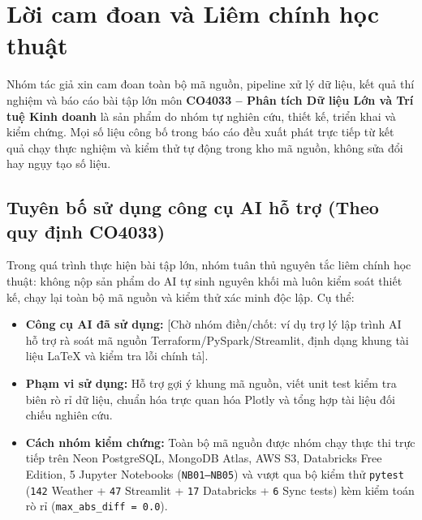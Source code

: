 \chapter*{Lời cam đoan và Liêm chính học thuật}

Nhóm tác giả xin cam đoan toàn bộ mã nguồn, pipeline xử lý dữ liệu, kết quả thí nghiệm và báo cáo bài tập lớn môn \textbf{CO4033 -- Phân tích Dữ liệu Lớn và Trí tuệ Kinh doanh} là sản phẩm do nhóm tự nghiên cứu, thiết kế, triển khai và kiểm chứng. Mọi số liệu công bố trong báo cáo đều xuất phát trực tiếp từ kết quả chạy thực nghiệm và kiểm thử tự động trong kho mã nguồn, không sửa đổi hay ngụy tạo số liệu.

\section*{Tuyên bố sử dụng công cụ AI hỗ trợ (Theo quy định CO4033)}
Trong quá trình thực hiện bài tập lớn, nhóm tuân thủ nguyên tắc liêm chính học thuật: không nộp sản phẩm do AI tự sinh nguyên khối mà luôn kiểm soát thiết kế, chạy lại toàn bộ mã nguồn và kiểm thử xác minh độc lập. Cụ thể:
\begin{itemize}[leftmargin=1.5em]
  \item \textbf{Công cụ AI đã sử dụng:} [Chờ nhóm điền/chốt: ví dụ trợ lý lập trình AI hỗ trợ rà soát mã nguồn Terraform/PySpark/Streamlit, định dạng khung tài liệu \LaTeX{} và kiểm tra lỗi chính tả].
  \item \textbf{Phạm vi sử dụng:} Hỗ trợ gợi ý khung mã nguồn, viết unit test kiểm tra biên rò rỉ dữ liệu, chuẩn hóa trực quan hóa Plotly và tổng hợp tài liệu đối chiếu nghiên cứu.
  \item \textbf{Cách nhóm kiểm chứng:} Toàn bộ mã nguồn được nhóm chạy thực thi trực tiếp trên Neon PostgreSQL, MongoDB Atlas, AWS S3, Databricks Free Edition, 5 Jupyter Notebooks (\texttt{NB01--NB05}) và vượt qua bộ kiểm thử \texttt{pytest} (\texttt{142} Weather + \texttt{47} Streamlit + \texttt{17} Databricks + \texttt{6} Sync tests) kèm kiểm toán rò rỉ (\texttt{max\_abs\_diff = 0.0}).
\end{itemize}
